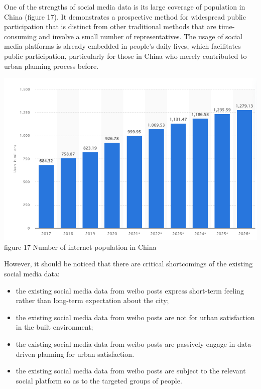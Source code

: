 \documentclass[
]{article}
\providecommand{\tightlist}{%
  \setlength{\itemsep}{0pt}\setlength{\parskip}{0pt}}
\begin{document}
One of the strengths of social media data is its large coverage of
population in China (figure 17). It demonstrates a prospective method
for widespread public participation that is distinct from other
traditional methods that are time-consuming and involve a small number
of representatives. The usage of social media platforms is already
embedded in people's daily lives, which facilitates public
participation, particularly for those in China who merely contributed to
urban planning process before.

\href{https://www.statista.com/statistics/277586/number-of-social-network-users-in-china/\#professional}{\includegraphics{maps/internet_user.png}}\\
figure 17 Number of internet population in China

However, it should be noticed that there are critical shortcomings of
the existing social media data:

\begin{itemize}
\tightlist
\item
  the existing social media data from weibo posts express short-term
  feeling rather than long-term expectation about the city;\\
\item
  the existing social media data from weibo posts are not for urban
  satisfaction in the built environment;\\
\item
  the existing social media data from weibo posts are passively engage
  in data-driven planning for urban satisfaction.
\item
  the existing social media data from weibo posts are subject to the
  relevant social platform so as to the targeted groups of people.
\end{itemize}
\end{document}
